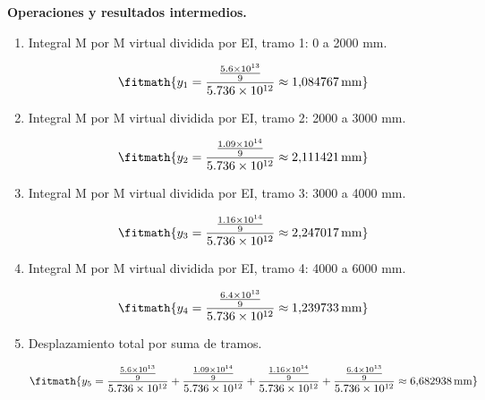 \noindent\textbf{Operaciones y resultados intermedios.}

\begin{enumerate}

\item Integral M por M virtual dividida por EI, tramo 1: 0 a 2000 mm.

\[\fitmath{y_{1}=\frac{\frac{5.6\times10^{13}}{9}}{5.736\times10^{12}}\approx 1{,}084767\,\mathrm{mm}}\]

\item Integral M por M virtual dividida por EI, tramo 2: 2000 a 3000 mm.

\[\fitmath{y_{2}=\frac{\frac{1.09\times10^{14}}{9}}{5.736\times10^{12}}\approx 2{,}111421\,\mathrm{mm}}\]

\item Integral M por M virtual dividida por EI, tramo 3: 3000 a 4000 mm.

\[\fitmath{y_{3}=\frac{\frac{1.16\times10^{14}}{9}}{5.736\times10^{12}}\approx 2{,}247017\,\mathrm{mm}}\]

\item Integral M por M virtual dividida por EI, tramo 4: 4000 a 6000 mm.

\[\fitmath{y_{4}=\frac{\frac{6.4\times10^{13}}{9}}{5.736\times10^{12}}\approx 1{,}239733\,\mathrm{mm}}\]

\item Desplazamiento total por suma de tramos.

\[\fitmath{y_{5}=\frac{\frac{5.6\times10^{13}}{9}}{5.736\times10^{12}}+\frac{\frac{1.09\times10^{14}}{9}}{5.736\times10^{12}}+\frac{\frac{1.16\times10^{14}}{9}}{5.736\times10^{12}}+\frac{\frac{6.4\times10^{13}}{9}}{5.736\times10^{12}}\approx 6{,}682938\,\mathrm{mm}}\]

\end{enumerate}
